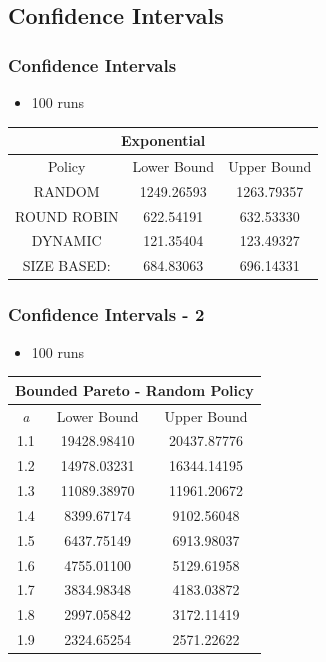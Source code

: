 \documentclass[red]{beamer}
\begin{document}
\subsection{Confidence Intervals}
\begin{frame}
\frametitle{Confidence Intervals}

\vspace{-1cm}
\begin{itemize}
\item 100 runs
\end{itemize}
\vspace{.5cm}

\hspace*{1cm}
\begin{tabular}{|c|c|c|}
\hline
\multicolumn{3}{|c|}{Exponential} \\
\hline
Policy & Lower Bound & Upper Bound \\
\hline
RANDOM & 1249.26593	& 1263.79357 \\
\hline
ROUND ROBIN & 622.54191	& 632.53330 \\
\hline
DYNAMIC & 121.35404	& 123.49327 \\
\hline
SIZE BASED: & 684.83063	& 696.14331 \\
\hline
\end{tabular}
\end{frame}

\begin{frame}
\frametitle{Confidence Intervals - 2}

\vspace{-.2cm}
\begin{itemize}
\item 100 runs
\end{itemize}
\vspace{.3cm}

\hspace*{1cm}
\begin{tabular}{|c|c|c|}
\hline
\multicolumn{3}{|c|}{Bounded Pareto - Random Policy} \\
\hline
\textit{a} & Lower Bound & Upper Bound \\
\hline
1.1 & 19428.98410 & 20437.87776 \\
\hline
1.2 & 14978.03231 & 16344.14195 \\
\hline
1.3 & 11089.38970 & 11961.20672 \\
\hline
1.4 & 8399.67174	 & 9102.56048 \\
\hline
1.5 & 6437.75149	 & 6913.98037 \\
\hline
1.6 & 4755.01100	 & 5129.61958 \\
\hline
1.7 & 3834.98348	 & 4183.03872 \\
\hline
1.8 & 2997.05842	 & 3172.11419\\
\hline
1.9 & 2324.65254	 & 2571.22622\\
\hline
\end{tabular}
\end{frame}
\end{document}
